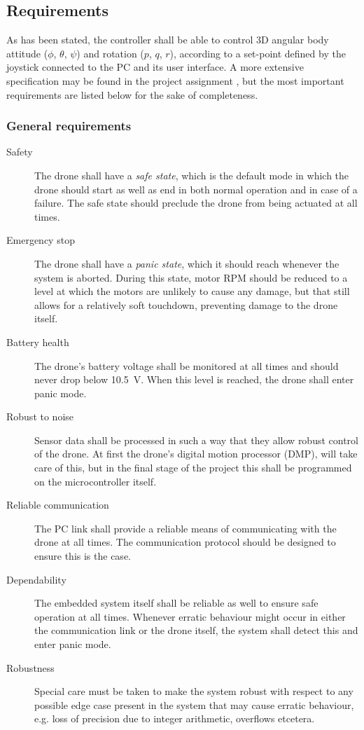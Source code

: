 \documentclass[final]{article}
\begin{document}
\subsection{Requirements}
As has been stated, the controller shall be able to control 3D angular body attitude ($\phi$, $\theta$, $\psi$) and rotation ($p$, $q$, $r$), according to a set-point defined by the joystick connected to the PC and its user interface.
A more extensive specification may be found in the project assignment \cite[3-6]{langendoen2017in4073}, but the most important requirements are listed below for the sake of completeness.

\subsubsection{General requirements}

\begin{description}
	\item[Safety] The drone shall have a \emph{safe state}, which is the default mode in which the drone should start as well as end in both normal operation and in case of a failure. The safe state should preclude the drone from being actuated at all times.
	\item[Emergency stop] The drone shall have a \emph{panic state}, which it should reach whenever the system is aborted. During this state, motor RPM should be reduced to a level at which the motors are unlikely to cause any damage, but that still allows for a relatively soft touchdown, preventing damage to the drone itself.
	\item[Battery health] The drone's battery voltage shall be monitored at all times and should never drop below \SI{10.5}{\volt}. When this level is reached, the drone shall enter panic mode.
	\item[Robust to noise] Sensor data shall be processed in such a way that they allow robust control of the drone. At first the drone's digital motion processor (DMP), will take care of this, but in the final stage of the project this shall be programmed on the microcontroller itself.
	\item[Reliable communication] The PC link shall provide a reliable means of communicating with the drone at all times. The communication protocol should be designed to ensure this is the case.
	\item[Dependability] The embedded system itself shall be reliable as well to ensure safe operation at all times. Whenever erratic behaviour might occur in either the communication link or the drone itself, the system shall detect this and enter panic mode.
	\item[Robustness] Special care must be taken to make the system robust with respect to any possible edge case present in the system that may cause erratic behaviour, e.g. loss of precision due to integer arithmetic, overflows etcetera.
\end{description}
\end{document}
